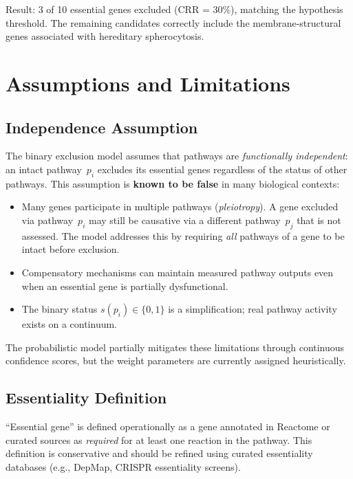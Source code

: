\documentclass[12pt,a4paper]{article}
\begin{document}
Result: 3 of 10 essential genes excluded (CRR = 30\%), matching the hypothesis threshold. The remaining candidates correctly include the membrane-structural genes associated with hereditary spherocytosis.

\section{Assumptions and Limitations}
\label{sec:limitations}

\subsection{Independence Assumption}

The binary exclusion model assumes that pathways are \emph{functionally independent}: an intact pathway~$p_i$ excludes its essential genes regardless of the status of other pathways. This assumption is \textbf{known to be false} in many biological contexts:

\begin{itemize}
    \item Many genes participate in multiple pathways (\emph{pleiotropy}). A gene excluded via pathway~$p_i$ may still be causative via a different pathway~$p_j$ that is not assessed. The model addresses this by requiring \emph{all} pathways of a gene to be intact before exclusion.
    \item Compensatory mechanisms can maintain measured pathway outputs even when an essential gene is partially dysfunctional.
    \item The binary status $s(p_i) \in \{0, 1\}$ is a simplification; real pathway activity exists on a continuum.
\end{itemize}

The probabilistic model partially mitigates these limitations through continuous confidence scores, but the weight parameters are currently assigned heuristically.

\subsection{Essentiality Definition}

``Essential gene'' is defined operationally as a gene annotated in Reactome or curated sources as \emph{required} for at least one reaction in the pathway. This definition is conservative and should be refined using curated essentiality databases (e.g., DepMap, CRISPR essentiality screens).
\end{document}
